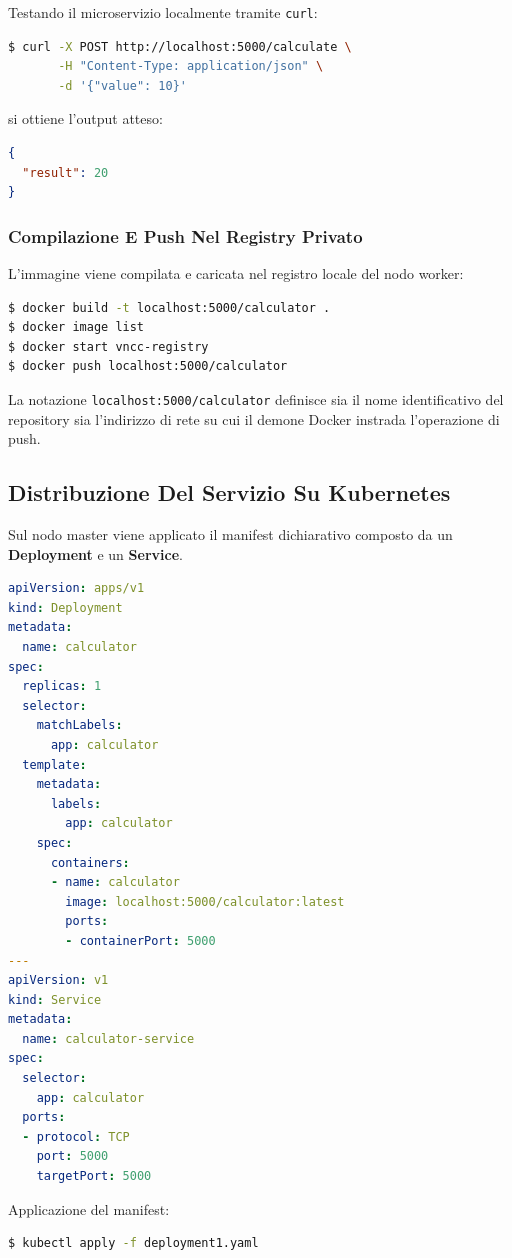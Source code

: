 \documentclass[11pt, a4paper]{article}
\begin{document}
Testando il microservizio localmente tramite \texttt{curl}:
\begin{lstlisting}[language=bash]
$ curl -X POST http://localhost:5000/calculate \
       -H "Content-Type: application/json" \
       -d '{"value": 10}'
\end{lstlisting}
si ottiene l'output atteso:
\begin{lstlisting}[language=json]
{
  "result": 20
}
\end{lstlisting}

\subsubsection{Compilazione E Push Nel Registry Privato}

L'immagine viene compilata e caricata nel registro locale del nodo worker:
\begin{lstlisting}[language=bash]
$ docker build -t localhost:5000/calculator .
$ docker image list
$ docker start vncc-registry
$ docker push localhost:5000/calculator
\end{lstlisting}
La notazione \texttt{localhost:5000/calculator} definisce sia il nome identificativo del repository sia l'indirizzo di rete su cui il demone Docker instrada l'operazione di push.

\subsection{Distribuzione Del Servizio Su Kubernetes}

Sul nodo master viene applicato il manifest dichiarativo composto da un \textbf{Deployment} e un \textbf{Service}.

\begin{lstlisting}[language=yaml]
apiVersion: apps/v1
kind: Deployment
metadata:
  name: calculator
spec:
  replicas: 1
  selector:
    matchLabels:
      app: calculator
  template:
    metadata:
      labels:
        app: calculator
    spec:
      containers:
      - name: calculator
        image: localhost:5000/calculator:latest
        ports:
        - containerPort: 5000
---
apiVersion: v1
kind: Service
metadata:
  name: calculator-service
spec:
  selector:
    app: calculator
  ports:
  - protocol: TCP
    port: 5000
    targetPort: 5000
\end{lstlisting}

Applicazione del manifest:
\begin{lstlisting}[language=bash]
$ kubectl apply -f deployment1.yaml
\end{lstlisting}
\end{document}
